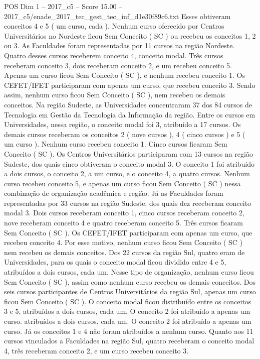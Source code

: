 \begin{textsample}{POS Dim 1 – 2017\_c5 – Score 15.00 – 2017\_c5/enade\_2017\_tec\_gest\_tec\_inf\_d1e30f89c6.txt}
Esses obtiveram conceitos 4 e 5 ( um curso, cada ).
Nenhum curso oferecido por Centros Universitários no Nordeste ficou Sem Conceito ( SC ) ou recebeu os conceitos 1, 2 ou 3.
As Faculdades foram representadas por 11 cursos na região Nordeste.
Quatro desses cursos receberem conceito 4, conceito modal.
Três cursos receberam conceito 3, dois receberam conceito 2, e um recebeu conceito 5.
Apenas um curso ficou Sem Conceito ( SC ), e nenhum recebeu conceito 1.
Os CEFET/IFET participaram com apenas um curso, que recebeu conceito 3.
Sendo assim, nenhum curso ficou Sem Conceito ( SC ), nem recebeu os demais conceitos.
Na região Sudeste, as Universidades concentraram 37 dos 84 cursos de Tecnologia em Gestão da Tecnologia da Informação da região.
Entre os cursos em Universidades, nessa região, o conceito modal foi 3, atribuído a 17 cursos.
Os demais cursos receberam os conceitos 2 ( nove cursos ), 4 ( cinco cursos ) e 5 ( um curso ).
Nenhum curso recebeu conceito 1.
Cinco cursos ficaram Sem Conceito ( SC ).
Os Centros Universitários participaram com 13 cursos na região Sudeste, dos quais cinco obtiveram o conceito modal 3.
O conceito 1 foi atribuído a dois cursos, o conceito 2, a um curso, e o conceito 4, a quatro cursos.
Nenhum curso recebeu conceito 5, e apenas um curso ficou Sem Conceito ( SC ) nessa combinação de organização acadêmica e região.
Já as Faculdades foram representadas por 33 cursos na região Sudeste, dos quais dez receberam conceito modal 3.
Dois cursos receberam conceito 1, cinco cursos receberam conceito 2, nove receberam conceito 4 e quatro receberam conceito 5.
Três cursos ficaram Sem Conceito ( SC ).
Os CEFET/IFET participaram com apenas um curso, que recebeu conceito 4.
Por esse motivo, nenhum curso ficou Sem Conceito ( SC ) nem recebeu os demais conceitos.
Dos 22 cursos da região Sul, quatro eram de Universidades, para os quais o conceito modal ficou dividido entre 4 e 5, atribuídos a dois cursos, cada um.
Nesse tipo de organização, nenhum curso ficou Sem Conceito ( SC ), assim como nenhum curso recebeu os demais conceitos.
Dos seis cursos participantes de Centros Universitários da região Sul, apenas um curso ficou Sem Conceito ( SC ).
O conceito modal ficou distribuído entre os conceitos 3 e 5, atribuídos a dois cursos, cada um.
O conceito 2 foi atribuído a apenas um curso. atribuídos a dois cursos, cada um.
O conceito 2 foi atribuído a apenas um curso.
Já os conceitos 1 e 4 não foram atribuídos a nenhum curso.
Quanto aos 11 cursos vinculados a Faculdades na região Sul, quatro receberam o conceito modal 4, três receberam conceito 2, e um curso recebeu conceito 3.

\end{textsample}
